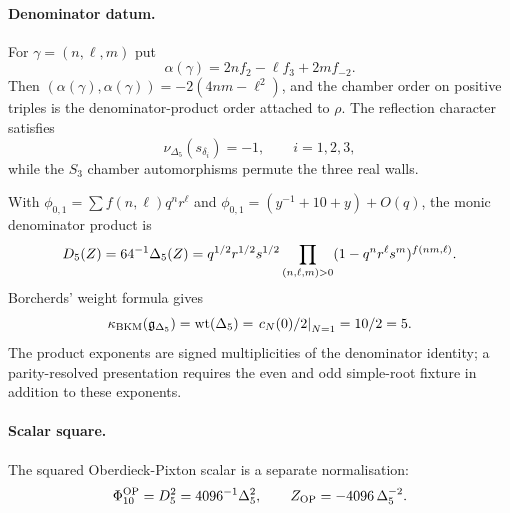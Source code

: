 \paragraph{Denominator datum.}
For $\gamma=(n,\ell,m)$ put
\[
  \alpha(\gamma)=2nf_2-\ell f_3+2mf_{-2}.
\]
Then $(\alpha(\gamma),\alpha(\gamma))=-2(4nm-\ell^2)$, and the chamber
order on positive triples is the denominator-product order attached to
$\rho$.  The reflection character satisfies
\[
  \nu_{\Delta_5}(s_{\delta_i})=-1,\qquad i=1,2,3,
\]
while the $S_3$ chamber automorphisms permute the three real walls.

With $\phi_{0,1}=\sum f(n,\ell)q^nr^\ell$ and
$\phi_{0,1}=(y^{-1}+10+y)+O(q)$, the monic denominator product is
\[
  D_5(Z)=64^{-1}\Delta_5(Z)
  =
  q^{1/2}r^{1/2}s^{1/2}
  \prod_{(n,\ell,m)>0}(1-q^nr^\ell s^m)^{f(nm,\ell)}.
\]
Borcherds' weight formula gives
\[
  \kappa_{\mathrm{BKM}}(\mathfrak{g}_{\Delta_5})=\mathrm{wt}(\Delta_5)
  =\left.c_N(0)/2\right|_{N=1}=10/2=5.
\]
The product exponents are signed multiplicities of the denominator
identity; a parity-resolved presentation requires the even and odd
simple-root fixture in addition to these exponents.

\paragraph{Scalar square.}
The squared Oberdieck-Pixton scalar is a separate normalisation:
\[
  \Phi_{10}^{\mathrm{OP}}=D_5^2=4096^{-1}\Delta_5^2,\qquad
  Z_{\mathrm{OP}}=-4096\,\Delta_5^{-2}.
\]
